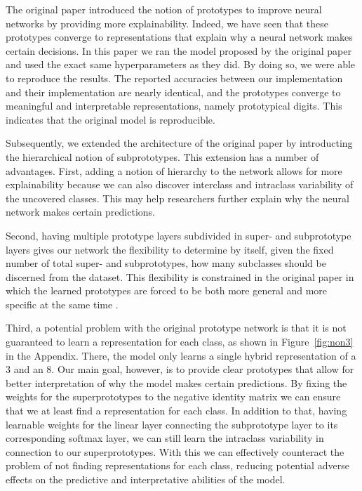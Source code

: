 The original paper \cite{li2018deep} introduced the notion of prototypes to improve neural networks by providing more explainability. Indeed, we have seen that these prototypes converge to representations that explain why a neural network makes certain decisions. In this paper we ran the model proposed by the original paper and used the exact same hyperparameters as they did. By doing so, we were able to reproduce the results. The reported accuracies between our implementation and their implementation are nearly identical, and the prototypes converge to meaningful and interpretable representations, namely prototypical digits. This indicates that the original model is reproducible. 

Subsequently, we extended the architecture of the original paper by introducting the hierarchical notion of subprototypes. This extension has a number of advantages. First, adding a notion of hierarchy to the network allows for more explainability because we can also discover interclass and intraclass variability of the uncovered classes. This may help researchers further explain why the neural network makes certain predictions.

Second, having multiple prototype layers subdivided in super- and subprototype layers gives our network the flexibility to determine by itself, given the fixed number of total super- and subprototypes, how many subclasses should be discerned from the dataset. This flexibility is constrained in the original paper in which the learned prototypes are forced to be both more general and more specific at the same time \cite{li2018deep}. 

Third, a potential problem with the original prototype network is that it is not guaranteed to learn a representation for each class, as shown in Figure~\ref{fig:non3} in the Appendix. There, the model only learns a single hybrid representation of a 3 and an 8. Our main goal, however, is to provide clear prototypes that allow for better interpretation of why the model makes certain predictions. By fixing the weights for the superprototypes to the negative identity matrix we can ensure that we at least find a representation for each class. In addition to that, having learnable weights for the linear layer connecting the subprototype layer to its corresponding softmax layer, we can still learn the intraclass variability in connection to our superprototypes. With this we can effectively counteract the problem of not finding representations for each class, reducing potential adverse effects on the predictive and interpretative abilities of the model.







